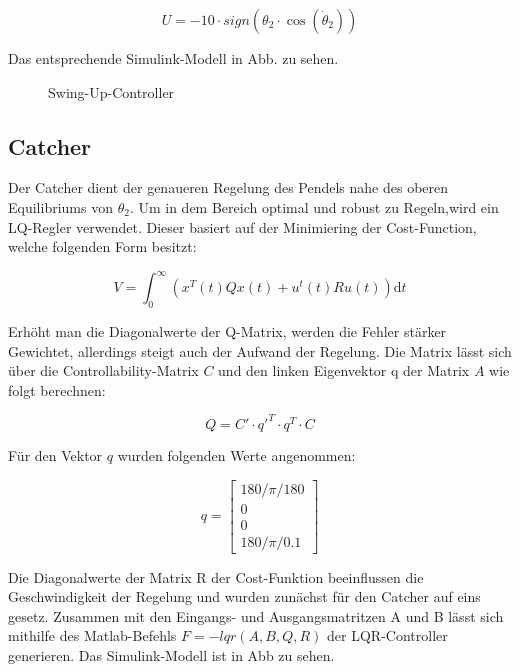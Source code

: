 \begin{equation}
U = -10 \cdot sign(\theta_2 \cdot \cos(\dot{\theta}_2))
\end{equation}

  Das entsprechende Simulink-Modell in Abb. %
zu sehen. 

\begin{figure}[h!]
  \caption{Swing-Up-Controller}
  \centering
\end{figure}

\subsection{Catcher}
\label{catcher} 

Der Catcher dient der genaueren Regelung des Pendels nahe des oberen Equilibriums von $ \theta_2 $. Um in dem Bereich optimal und robust zu Regeln,wird ein LQ-Regler verwendet. Dieser basiert auf der Minimiering der Cost-Function, welche folgenden Form besitzt:

\begin{equation}
 V = \int_0^\infty \! (x^T(t) Qx(t) + u^t(t) R u(t))  \mathrm{d}t
\end{equation}

Erhöht man die Diagonalwerte der Q-Matrix, werden die Fehler stärker Gewichtet, allerdings steigt auch der Aufwand der Regelung. Die Matrix lässt sich über die Controllability-Matrix $C$ und den linken Eigenvektor q der Matrix $A$
wie folgt berechnen:

\begin{equation}
 Q = C' \cdot q'^T \cdot q^T \cdot C
\end{equation}

Für den Vektor $q$ wurden folgenden Werte angenommen:

\begin{equation}
q =\begin{bmatrix}
         180/\pi/180 \\
         0\\
         0\\
         180/\pi/0.1
        \end{bmatrix}
\end{equation}
 
Die Diagonalwerte der Matrix R der Cost-Funktion beeinflussen die Geschwindigkeit der Regelung und wurden zunächst für den Catcher auf eins gesetz.
Zusammen mit den Eingangs- und Ausgangsmatritzen A und B lässt sich mithilfe des Matlab-Befehls $F = -lqr(A,B,Q,R)$ der LQR-Controller generieren.
Das Simulink-Modell ist in Abb zu sehen.



